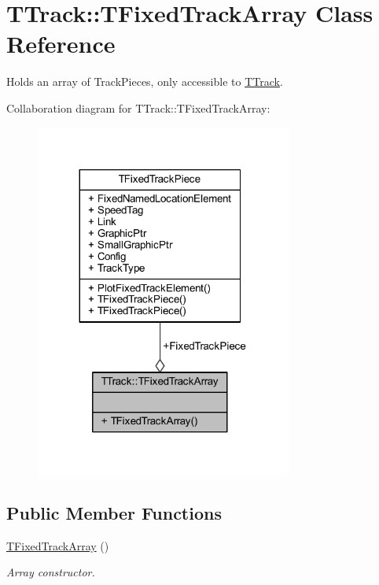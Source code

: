 \hypertarget{class_t_track_1_1_t_fixed_track_array}{}\section{T\+Track\+:\+:T\+Fixed\+Track\+Array Class Reference}
\label{class_t_track_1_1_t_fixed_track_array}


Holds an array of Track\+Pieces, only accessible to \mbox{\hyperlink{class_t_track}{T\+Track}}.  




Collaboration diagram for T\+Track\+:\+:T\+Fixed\+Track\+Array\+:
\nopagebreak
\begin{figure}[H]
\begin{center}
\leavevmode
\includegraphics[width=239pt]{class_t_track_1_1_t_fixed_track_array__coll__graph}
\end{center}
\end{figure}
\subsection*{Public Member Functions}
\begin{DoxyCompactItemize}
\item 
\mbox{\label{class_t_track_1_1_t_fixed_track_array_a0fd7c1a4d4b9f09704a39c40bd202462}} 
\mbox{\hyperlink{class_t_track_1_1_t_fixed_track_array_a0fd7c1a4d4b9f09704a39c40bd202462}{T\+Fixed\+Track\+Array}} ()
\begin{DoxyCompactList}\small\item\em Array constructor. \end{DoxyCompactList}\end{DoxyCompactItemize}
